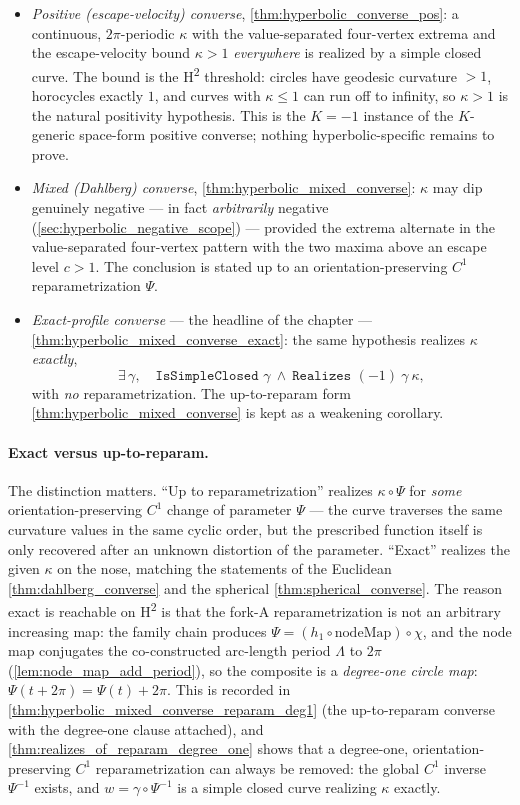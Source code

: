 \begin{itemize}
\item \emph{Positive (escape-velocity) converse},
  \cref{thm:hyperbolic_converse_pos}: a continuous, $2\pi$-periodic $\kappa$
  with the value-separated four-vertex extrema and the escape-velocity bound
  $\kappa>1$ \emph{everywhere} is realized by a simple closed curve. The bound
  is the H\textsuperscript{2} threshold: circles have geodesic curvature $>1$,
  horocycles exactly $1$, and curves with $\kappa\le1$ can run off to infinity,
  so $\kappa>1$ is the natural positivity hypothesis. This is the $K=-1$
  instance of the $K$-generic space-form positive converse; nothing
  hyperbolic-specific remains to prove.
\item \emph{Mixed (Dahlberg) converse},
  \cref{thm:hyperbolic_mixed_converse}: $\kappa$ may dip genuinely negative —
  in fact \emph{arbitrarily} negative (\cref{sec:hyperbolic_negative_scope}) —
  provided the extrema alternate in the value-separated four-vertex pattern
  with the two maxima above an escape level $c>1$. The conclusion is stated up
  to an orientation-preserving $C^1$ reparametrization $\Psi$.
\item \emph{Exact-profile converse} — the headline of the chapter —
  \cref{thm:hyperbolic_mixed_converse_exact}: the same hypothesis realizes
  $\kappa$ \emph{exactly},
  \[
    \exists\,\gamma,\quad \texttt{IsSimpleClosed }\gamma\ \wedge\
    \texttt{Realizes }(-1)\ \gamma\ \kappa,
  \]
  with \emph{no} reparametrization. The up-to-reparam form
  \cref{thm:hyperbolic_mixed_converse} is kept as a weakening corollary.
\end{itemize}

\paragraph{Exact versus up-to-reparam.}
The distinction matters. ``Up to reparametrization'' realizes $\kappa\circ\Psi$
for \emph{some} orientation-preserving $C^1$ change of parameter $\Psi$ — the
curve traverses the same curvature values in the same cyclic order, but the
prescribed function itself is only recovered after an unknown distortion of
the parameter. ``Exact'' realizes the given $\kappa$ on the nose, matching the
statements of the Euclidean \cref{thm:dahlberg_converse} and the spherical
\cref{thm:spherical_converse}. The reason exact is reachable on
H\textsuperscript{2} is that the fork-A reparametrization is not an arbitrary
increasing map: the family chain produces
$\Psi=(h_1\circ\mathrm{nodeMap})\circ\chi$, and the node map conjugates the
co-constructed arc-length period $\Lambda$ to $2\pi$
(\cref{lem:node_map_add_period}), so the composite is a \emph{degree-one
circle map}: $\Psi(t+2\pi)=\Psi(t)+2\pi$. This is recorded in
\cref{thm:hyperbolic_mixed_converse_reparam_deg1} (the up-to-reparam converse
with the degree-one clause attached), and
\cref{thm:realizes_of_reparam_degree_one} shows that a degree-one,
orientation-preserving $C^1$ reparametrization can always be removed: the
global $C^1$ inverse $\Psi^{-1}$ exists, and $w=\gamma\circ\Psi^{-1}$ is a simple
closed curve realizing $\kappa$ exactly.


